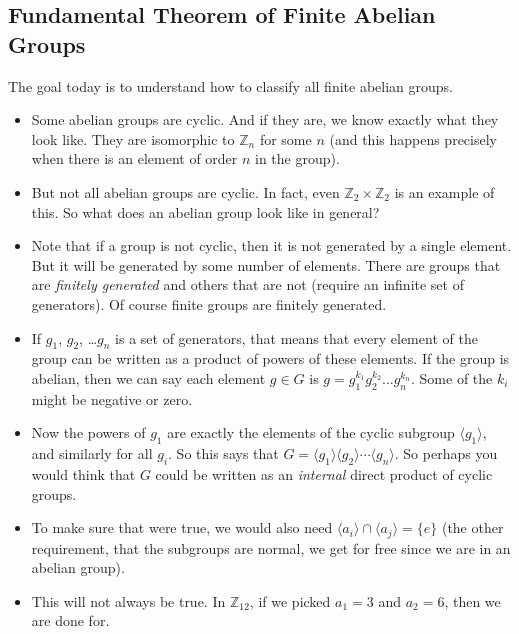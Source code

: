 \documentclass[12pt]{article}
\theoremstyle{plain}
\theoremstyle{definition}
\theoremstyle{remark}
\def\Z{\mathbb Z}
\begin{document}
\subsection*{Fundamental Theorem of Finite Abelian Groups}

The goal today is to understand how to classify all finite abelian groups.

\begin{itemize}
\item Some abelian groups are cyclic.  And if they are, we know exactly what they look like.  They are isomorphic to $\Z_{n}$ for some $n$ (and this happens precisely when there is an element of order $n$ in the group).

\item But not all abelian groups are cyclic.  In fact, even $\Z_2\times \Z_2$ is an example of this. So what does an abelian group look like in general?

\item Note that if a group is not cyclic, then it is not generated by a single element.  But it will be generated by some number of elements.  There are groups that are \emph{finitely generated} and others that are not (require an infinite set of generators).  Of course finite groups are finitely generated.

\item If $g_1$, $g_2$, \ldots $g_n$ is a set of generators, that means that every element of the group can be written as a product of powers of these elements.  If the group is abelian, then we can say each element $g \in G$ is $g = g_1^{k_1}g_2^{k_2}\ldots g_n^{k_n}$.  Some of the $k_i$ might be negative or zero.

\item Now the powers of $g_1$ are exactly the elements of the cyclic subgroup $\langle g_1\rangle$, and similarly for all $g_i$.    So this says that $G = \langle g_1\rangle\langle g_2\rangle\cdots\langle g_n\rangle$.  So perhaps you would think that $G$ could be written as an \emph{internal} direct product of cyclic groups.

\item To make sure that were true, we would also need $\langle a_i \rangle \cap \langle a_j\rangle = \{e\}$ (the other requirement, that the subgroups are normal, we get for free since we are in an abelian group).

\item This will not always be true.  In $\Z_{12}$, if we picked $a_1 = 3$ and $a_2 = 6$, then we are done for.


\end{itemize}
\end{document}
